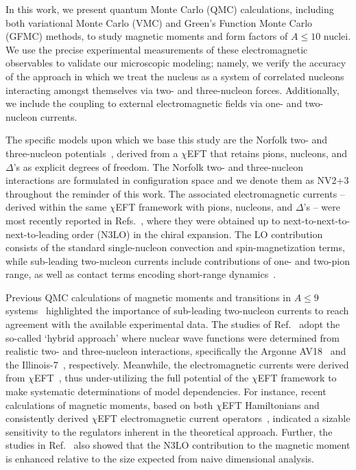\documentclass[aps,prc,floatfix,showpacs,twocolumn, preprintnumbers]{revtex4-2}
\begin{document}
In this work, we present quantum Monte Carlo (QMC) calculations, including both variational Monte Carlo (VMC) and Green's Function Monte Carlo (GFMC) methods, to study magnetic moments and form factors of $A\le 10$ nuclei. We use the precise experimental measurements of these electromagnetic observables to validate our microscopic modeling; namely, we verify the accuracy of the approach in which we treat the nucleus as a system of correlated nucleons interacting amongst themselves via two- and three-nucleon forces. Additionally, we include the coupling to external electromagnetic fields via one- and two-nucleon currents.

The specific models upon which we base this study are the Norfolk two- and three-nucleon potentials~\cite{Piarulli:2014bda,Piarulli:2016vel,Piarulli:2017dwd,Baroni:2018fdn,Piarulli:2019cqu}, derived from a $\chi$EFT that retains pions, nucleons, and $\Delta$'s as explicit degrees of freedom. The Norfolk two- and three-nucleon interactions are formulated in configuration space and we denote them as NV2+3 throughout the reminder of this work. The associated electromagnetic currents -- derived within the same $\chi$EFT framework with pions, nucleons, and $\Delta$'s -- were most recently reported in Refs.~\cite{Schiavilla:2018udt,Gnech:2022vwr}, where they were obtained up to next-to-next-to-next-to-leading order (N3LO) in the chiral expansion. The LO contribution consists of the standard single-nucleon convection and spin-magnetization terms, while sub-leading two-nucleon currents include contributions of one- and two-pion range, as well as contact terms encoding short-range dynamics~\cite{Schiavilla:2018udt}.

Previous QMC calculations of magnetic moments and transitions in $A\le 9$ systems~\cite{Pastore:2012rp} highlighted the importance of sub-leading two-nucleon currents to reach agreement with the available experimental data. The studies of Ref.~\cite{Pastore:2012rp} adopt the so-called `hybrid approach' where nuclear wave functions were determined from realistic two- and three-nucleon interactions, specifically the Argonne AV18~\cite{Wiringa:1994wb} and the Illinois-7~\cite{doi:10.1063/1.2932280}, respectively. Meanwhile, the electromagnetic currents were derived from $\chi$EFT~\cite{Pastore:2008ui,Pastore:2009is,Pastore:2011ip,Piarulli:2012bn}, thus under-utilizing the full potential of the $\chi$EFT framework to make systematic determinations of model dependencies. For instance, recent calculations of magnetic moments, based on both $\chi$EFT Hamiltonians and consistently derived $\chi$EFT electromagnetic current operators~\cite{Gnech:2022vwr,Martin:2023dhl,Pal:2023gll}, indicated a sizable sensitivity to the regulators inherent in the theoretical approach. Further, the studies in Ref.~\cite{Gnech:2022vwr,Martin:2023dhl} also showed that the N3LO contribution to the magnetic moment is enhanced relative to the size expected from naive dimensional analysis. 
\end{document}
